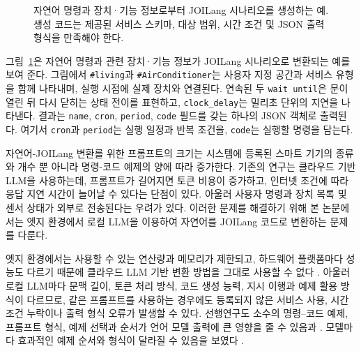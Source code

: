 \documentclass[10pt,twocolumn]{article}
\begin{document}
\begin{figure}[!t]
\caption{\textcolor{revisionblue}{자연어 명령과 장치·기능 정보로부터 JOILang 시나리오를 생성하는 예. 생성 코드는 제공된 서비스 스키마, 대상 범위, 시간 조건 및 JSON 출력 형식을 만족해야 한다.}}
\label{fig:joilang_glance}
\end{figure}

그림~\ref{fig:joilang_glance}은 자연어 명령과 관련 장치·기능 정보가 JOILang 시나리오로 변환되는 예를 보여 준다.
그림에서 \texttt{\#living}과 \texttt{\#AirConditioner}는 사용자 지정 공간과 서비스 유형을 함께 나타내며, 실행 시점에 실제 장치와 연결된다. 연속된 두 \texttt{wait until}은 문이 열린 뒤 다시 닫히는 상태 전이를 표현하고, \texttt{clock\_delay}는 밀리초 단위의 지연을 나타낸다. 결과는 \texttt{name}, \texttt{cron}, \texttt{period}, \texttt{code} 필드를 갖는 하나의 JSON 객체로 출력된다. 여기서 \texttt{cron}과 \texttt{period}는 실행 일정과 반복 조건을, \texttt{code}는 실행할 명령을 담는다.

자연어-JOILang 변환를 위한 프롬프트의 크기는 시스템에 등록된 스마트 기기의 종류와 개수 뿐 아니라 명령-코드 예제의 양에 따라 증가한다.
기존의 연구는 클라우드 기반 LLM을 사용하는데,
프롬프트가 길어지면 토큰 비용이 증가하고, 인터넷 조건에 따라 응답 지연 시간이 늘어날 수 있다는 단점이 있다. 아울러 사용자 명령과 장치 목록 및 센서 상태가 외부로 전송된다는 우려가 있다. 이러한 문제를 해결하기 위해 본 논문에서는 엣지 환경에서 로컬 LLM을 이용하여 자연어를 JOILang 코드로 변환하는 문제를 다룬다.

엣지 환경에서는 사용할 수 있는 연산량과 메모리가 제한되고, 하드웨어 플랫폼마다 성능도 다르기 때문에 클라우드 LLM 기반 변환 방법을 그대로 사용할 수 없다  \cite{REF_EDGE_GENAI_SURVEY,REF_EDGE_LLM_REVIEW}. 아울러 로컬 LLM마다 문맥 길이, 토큰 처리 방식, 코드 생성 능력, 지시 이행과 예제 활용 방식이 다르므로, 같은 프롬프트를 사용하는 경우에도 등록되지 않은 서비스 사용, 시간 조건 누락이나 출력 형식 오류가 발생할 수 있다.
선행연구도 소수의 명령--코드 예제, 프롬프트 형식, 예제 선택과 순서가 언어 모델 출력에 큰 영향을 줄 수 있음과 \cite{REF_ZHAO_CALIBRATE}. 모델마다 효과적인 예제 순서와 형식이 달라질 수 있음을 보였다 \cite{REF_PROMPT_ORDER,REF_PROMPT_FORMAT_SENSITIVITY}.
\end{document}
